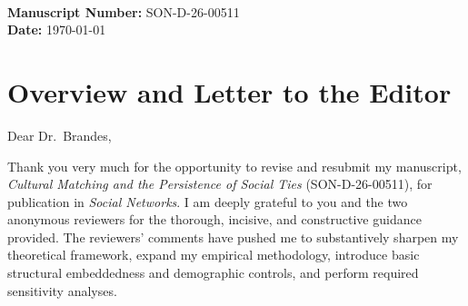\documentclass[11pt]{article}
\begin{document}
\\[6pt]
\textbf{Manuscript Number:} SON-D-26-00511\\
\textbf{Date:} \today\\[12pt]

\section*{Overview and Letter to the Editor}

Dear Dr.~Brandes,

Thank you very much for the opportunity to revise and resubmit my manuscript, \textit{Cultural Matching and the Persistence of Social Ties} (SON-D-26-00511), for publication in \textit{Social Networks}. I am deeply grateful to you and the two anonymous reviewers for the thorough, incisive, and constructive guidance provided. The reviewers' comments have pushed me to substantively sharpen my theoretical framework, expand my empirical methodology, introduce basic structural embeddedness and demographic controls, and perform required sensitivity analyses.
\end{document}
